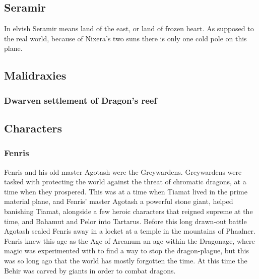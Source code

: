 \documentclass[a4paper]{article}
\begin{document}
\subsection{Seramir}
In elvish Seramir means land of the east, or land of frozen heart. As supposed to the real world, because of Nixera's two suns there is only one cold pole on this plane.

\subsection{Malidraxies}

\subsubsection{Dwarven settlement of Dragon's reef}


\subsection{Characters}

\subsubsection{Fenris}
Fenris and his old master Agotash were the Greywardens. Greywardens were tasked with protecting the world against the threat of chromatic dragons, at a time when they prospered. This was at a time when Tiamat lived in the prime material plane, and Fenris' master Agotash a powerful stone giant, helped banishing Tiamat, alongside a few heroic characters that reigned supreme at the time, and Bahamut and Pelor into Tartarus. Before this long drawn-out battle Agotash sealed Fenris away in a locket at a temple in the mountains of Phaalner. Fenris knew this age as the Age of Arcanum an age within the Dragonage, where magic was experimented with to find a way to stop the dragon-plague, but this was so long ago that the world has mostly forgotten the time. At this time the Behir was carved by giants in order to combat dragons.
\end{document}
